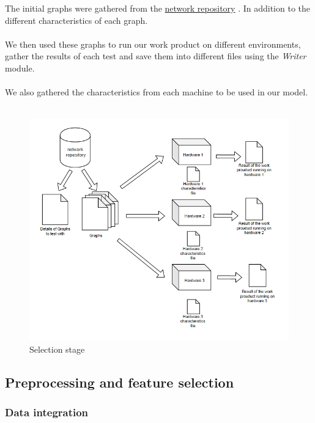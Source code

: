 The initial graphs were gathered from the \href{https://networkrepository.com}{network repository} . In addition to the different characteristics of each graph.
\\
\\
We then used these graphs to run our work product on different environments, gather the results of each test and save them into different files using the \textit{Writer} module.
\\
\\
We also gathered the characteristics from each machine to be used in our model.
\\
\\
\begin{figure}[h!]
    \centering
    \includegraphics{chapters/Selection.png}
    \caption{Selection stage}
    \label{fig:Selection stage}
\end{figure}
\FloatBarrier
\subsection{Preprocessing and feature selection}

\subsubsection{Data integration}

